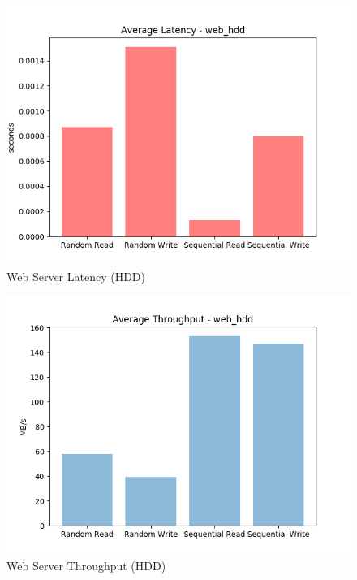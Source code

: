 \documentclass[10pt, author, twocolumn]{article}
\begin{document}
\begin{figure}[h!]
    \includegraphics[scale=0.5]{../graphs/web_hdd-lat.png}
    \caption{Web Server Latency (HDD)}
    \label{fig:hhd_web_lat}
\end{figure}

\begin{figure}[h!]
    \includegraphics[scale=0.5]{../graphs/web_hdd-thru.png}
    \caption{Web Server Throughput (HDD)}
    \label{fig:hdd_web_thru}
\end{figure}
\end{document}
